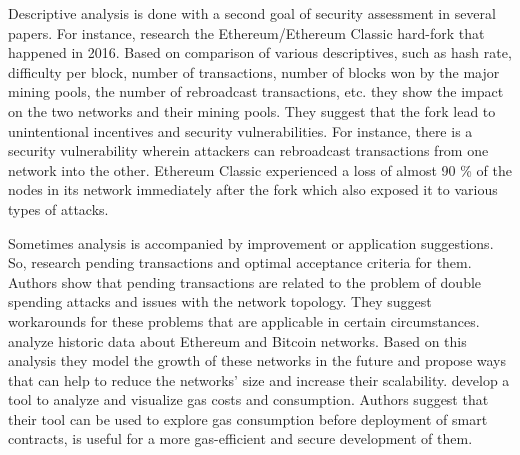 Descriptive analysis is done with a second goal of security assessment in several papers. 
For instance, \cite{kiffer2017stick} research the Ethereum/Ethereum Classic hard-fork that happened in 2016. 
Based on comparison of various descriptives, such as hash rate, difficulty per block, number of transactions, number of blocks won by the major mining pools, the number of rebroadcast transactions, etc. they show the impact on the two networks and their mining pools.
They suggest that the fork lead to unintentional incentives and security vulnerabilities. 
For instance, there is a security vulnerability wherein attackers can rebroadcast transactions from one network into the other.
Ethereum Classic experienced a loss of almost 90 \% of the nodes in its network immediately after the fork which also exposed it to various types of attacks.

Sometimes analysis is accompanied by improvement or application suggestions. 
So, \cite{bentkeanalysis} research pending transactions and optimal acceptance criteria for them. 
Authors show that pending transactions are related to the problem of double spending attacks and issues with the network topology.
They suggest workarounds for these problems that are applicable in certain circumstances.  
\cite{dennis2019analysis} analyze historic data about Ethereum and Bitcoin networks. 
Based on this analysis they model the growth of these networks in the future and propose ways that can help to reduce the networks' size and increase their scalability.
\cite{signer2018gas} develop a tool to analyze and visualize gas costs and consumption.
Authors suggest that their tool can be used to explore gas consumption before deployment of smart contracts, is useful for a more gas-efficient and secure development of them. 



